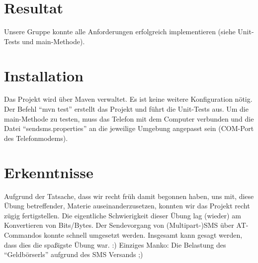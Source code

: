 \documentclass[paper=a4, fontsize=11pt]{scrartcl}
\begin{document}
\section{Resultat}
Unsere Gruppe konnte alle Anforderungen erfolgreich implementieren (siehe Unit-Tests und main-Methode).

\section{Installation}
Das Projekt wird über Maven verwaltet. Es ist keine weitere Konfiguration nötig. Der Befehl "`mvn test"' erstellt das Projekt und führt die Unit-Tests aus. Um die main-Methode zu testen, muss das Telefon mit dem Computer verbunden und die Datei "`sendsms.properties"' an die jeweilige Umgebung angepasst sein (COM-Port des Telefonmodems).

\section{Erkenntnisse}
Aufgrund der Tatsache, dass wir recht früh damit begonnen haben, uns mit, diese Übung betreffender, Materie auseinanderzusetzen, konnten wir das Projekt recht zügig fertigstellen. Die eigentliche Schwierigkeit dieser Übung lag (wieder) am Konvertieren von Bits/Bytes. Der Sendevorgang von (Multipart-)SMS über AT-Commandos konnte schnell umgesetzt werden. Insgesamt kann gesagt werden, dass dies die spaßigste Übung war. :) Einziges Manko: Die Belastung des "`Geldbörserls"' aufgrund des SMS Versands ;)
\end{document}
